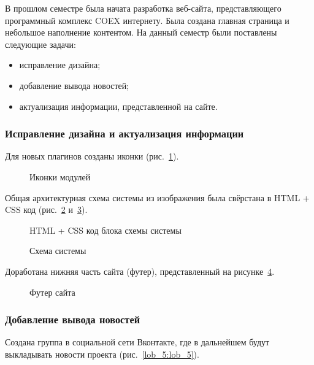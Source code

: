 В прошлом семестре была начата разработка веб-сайта, представляющего программный комплекс COEX интернету. Была создана главная страница и небольшое наполнение контентом. На данный семестр были поставлены следующие задачи:

\begin{itemize}
  \item исправление дизайна;
  \item добавление вывода новостей;
  \item актуализация информации, представленной на сайте.
\end{itemize}

\subsubsection{Исправление дизайна и актуализация информации}

Для новых плагинов созданы иконки (рис.~\ref{lob_1:lob_1}).

\begin{figure}[h!]
\caption{Иконки модулей}
\label{lob_1:lob_1}
\end{figure}

Общая архитектурная схема системы из изображения была свёрстана в HTML + CSS код (рис.~\ref{lob_2:lob_2} и~\ref{lob_3:lob_3}).

\begin{figure}[h!]
\caption{HTML + CSS код блока схемы системы}
\label{lob_2:lob_2}
\end{figure}

\begin{figure}[h!]
\caption{Схема системы}
\label{lob_3:lob_3}
\end{figure}

Доработана нижняя часть сайта (футер), представленный на рисунке~\ref{lob_4:lob_4}.

\begin{figure}[h!]
\caption{Футер сайта}
\label{lob_4:lob_4}
\end{figure}

\subsubsection{Добавление вывода новостей}

Создана группа в социальной сети Вконтакте, где в дальнейшем будут выкладывать новости проекта (рис.~\ref{lob_5:lob_5}).

